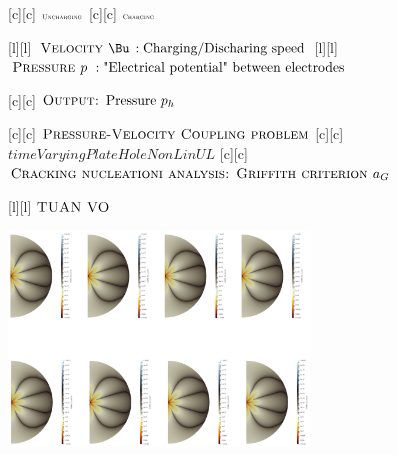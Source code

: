 [c][c] {$\textsc{\tiny Uncharging}$}
[c][c] {$\textsc{\tiny Charging}$}

[l][l] {$\textsc{Velocity } \Bu \, :\text{Charging/Discharing speed}$}
[l][l] {$\textsc{Pressure } p   \,\, :\text{"Electrical potential" between electrodes}$}

[c][c] {$\textsc{Output: } \text{Pressure } p_h$}

[c][c] {$\textsc{Pressure-Velocity Coupling problem}$}
[c][c] {$timeVaryingPlateHoleNonLinUL$}
[c][c] {$\textsc{Cracking nucleationi analysis: Griffith criterion } a_{G}$}

[l][l] {$\textsc{TUAN VO}$}

\includegraphics[width=0.6\textwidth]{routine_woTV_numa.eps}